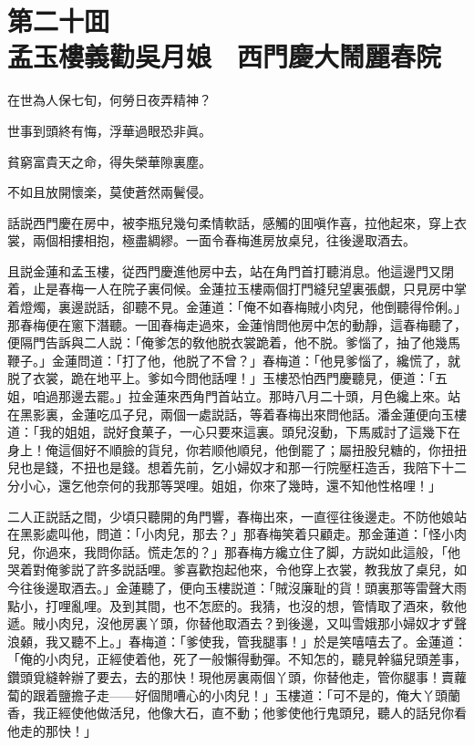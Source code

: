 
\chapter*{第二十囬　\\孟玉樓義勸吳月娘　西門慶大鬧麗春院}


\begin{myquote}
在世為人保七旬，何勞日夜弄精神？

世事到頭終有悔，浮華過眼恐非眞。

貧窮富貴天之命，得失榮華隙裏塵。

不如且放開懷楽，莫使蒼然兩鬢侵。
\end{myquote}

話説西門慶在房中，被李瓶兒幾句柔情軟話，感觸的囬嗔作喜，拉他起來，穿上衣裳，兩個相摟相抱，極盡綢繆。一面令春梅進房放桌兒，往後邊取酒去。

且説金蓮和孟玉樓，従西門慶進他房中去，站在角門首打聽消息。他這邊門又閉着，止是春梅一人在院子裏伺候。金蓮拉玉樓兩個打門縫兒望裏張覷，只見房中掌着燈燭，裏邊説話，卻聽不見。金蓮道：「俺不如春梅賊小肉兒，他倒聽得伶俐。」那春梅便在窻下潛聽。一囬春梅走過來，金蓮悄問他房中怎的動靜，這春梅聽了，便隔門告訴與二人説：「俺爹怎的敎他脱衣裳跪着，他不脱。爹惱了，抽了他幾馬鞭子。」金蓮問道：「打了他，他脱了不曾？」春梅道：「他見爹惱了，纔慌了，就脱了衣裳，跪在地平上。爹如今問他話哩！」玉樓恐怕西門慶聽見，便道：「五姐，咱過那邊去罷。」拉金蓮來西角門首站立。那時八月二十頭，月色纔上來。站在黑影裏，金蓮吃瓜子兒，兩個一處説話，等着春梅出來問他話。潘金蓮便向玉樓道：「我的姐姐，説好食菓子，一心只要來這裏。頭兒沒動，下馬威討了這幾下在身上！俺這個好不順臉的貨兒，你若顺他順兒，他倒罷了；屬扭股兒糖的，你扭扭兒也是錢，不扭也是錢。想着先前，乞小婦奴才和那一行院壓枉造舌，我陪下十二分小心，還乞他奈何的我那等哭哩。姐姐，你來了幾時，還不知他性格哩！」

二人正説話之間，少頃只聽開的角門響，春梅出來，一直徑往後邊走。不防他娘站在黑影處叫他，問道：「小肉兒，那去？」那春梅笑着只顧走。那金蓮道：「怪小肉兒，你過來，我問你話。慌走怎的？」那春梅方纔立住了脚，方説如此這般，「他哭着對俺爹説了許多説話哩。爹喜歡抱起他來，令他穿上衣裳，教我放了桌兒，如今往後邊取酒去。」金蓮聽了，便向玉樓説道：「賊沒廉耻的貨！頭裏那等雷聲大雨點小，打哩亂哩。及到其間，也不怎麽的。我猜，也沒的想，管情取了酒來，敎他遞。賊小肉兒，沒他房裏丫頭，你替他取酒去？到後邊，又叫雪娥那小婦奴才ず聲浪顙，我又聽不上。」春梅道：「爹使我，管我腿事！」於是笑嘻嘻去了。金蓮道：「俺的小肉兒，正經使着他，死了一般懶得動彈。不知怎的，聽見幹貓兒頭差事，鑽頭覓縫幹辦了要去，去的那快！現他房裏兩個丫頭，你替他走，管你腿事！賣蘿蔔的跟着鹽擔子走——好個閒嘈心的小肉兒！」玉樓道：「可不是的，俺大丫頭蘭香，我正經使他做活兒，他像大石，直不動；他爹使他行鬼頭兒，聽人的話兒你看他走的那快！」

